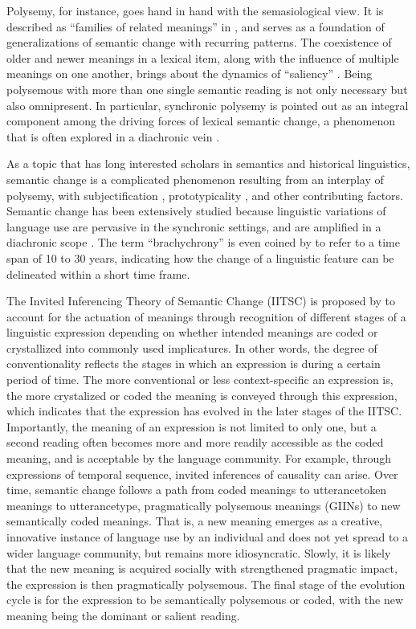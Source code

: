 Polysemy, for instance, goes hand in hand with the semasiological view. It is described as ``families of related meanings'' in \textcite[11]{traugott2001regularity}, and serves as a foundation of generalizations of semantic change with recurring patterns. The co­existence of older and newer meanings in a lexical item, along with the influence of multiple meanings on one another, brings about the dynamics of ``saliency'' \parencite[12]{traugott2001regularity}. Being polysemous with more than one single semantic reading is not only necessary but also omnipresent. In particular, synchronic polysemy is pointed out as an integral component among the driving forces of lexical semantic change, a phenomenon that is often explored in a diachronic vein \parencite{robertinvanhove2008}.

As a topic that has long interested scholars in semantics and historical linguistics, semantic change is a complicated phenomenon resulting from an interplay of polysemy, with subjectification \parencite{traugott2001regularity}, prototypicality \parencite{geeraerts1997diachronic}, and other contributing factors. Semantic change has been extensively studied because linguistic variations of language use are pervasive in the synchronic settings, and are amplified in a diachronic scope \parencite{semanticincrowley2010,bowern2019semantic}. The term ``brachychrony'' is even coined by \textcite{mair1998corpora} to refer to a time span of 10 to 30 years, indicating how the change of a linguistic feature can be delineated within a short time frame.

The Invited Inferencing Theory of Semantic Change (IITSC) is proposed by \textcite[34-40]{traugott2001regularity} to account for the actuation of meanings through recognition of different stages of a linguistic expression depending on whether intended meanings are coded or crystallized into commonly used implicatures. In other words, the degree of conventionality reflects the stages in which an expression is during a certain period of time. The more conventional or less context-specific an expression is, the more crystalized or coded the meaning is conveyed through this expression, which indicates that the expression has evolved in the later stages of the IITSC. Importantly, the meaning of an expression is not limited to only one, but a second reading often becomes more and more readily accessible as the coded meaning, and is acceptable by the language community. For example, through expressions of temporal sequence, invited inferences of causality can arise. Over time, semantic change follows a path from coded meanings to utterance­token meanings to utterance­type, pragmatically polysemous meanings (GIINs) to new semantically coded meanings. That is, a new meaning emerges as a creative, innovative instance of language use by an individual and does not yet spread to a wider language community, but remains more idiosyncratic. Slowly, it is likely that the new meaning is acquired socially with strengthened pragmatic impact, the expression is then pragmatically polysemous. The final stage of the evolution cycle is for the expression to be semantically polysemous or coded, with the new meaning being the dominant or salient reading.

